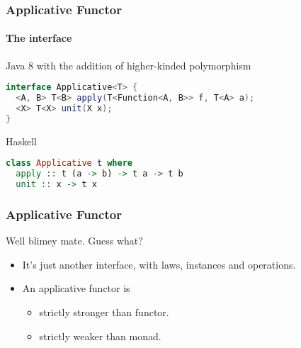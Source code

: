 \begin{frame}[fragile]
\frametitle{Applicative Functor}
\framesubtitle{The interface}
\begin{block}{Java 8 with the addition of higher-kinded polymorphism}
\begin{lstlisting}[style=language,language=java]
interface Applicative<T> {
  <A, B> T<B> apply(T<Function<A, B>> f, T<A> a);
  <X> T<X> unit(X x);
}
\end{lstlisting}
\end{block}
\begin{block}{Haskell}
\begin{lstlisting}[style=language,language=haskell]
class Applicative t where
  apply :: t (a -> b) -> t a -> t b
  unit :: x -> t x
\end{lstlisting}
\end{block}
\end{frame}

\begin{frame}[fragile]
\frametitle{Applicative Functor}
\begin{block}{Well blimey mate. Guess what?}
\begin{itemize}
\item It's just another interface, with laws, instances and operations.
\item An applicative functor is
  \begin{itemize}
  \item strictly stronger than functor.
  \item strictly weaker than monad.
  \end{itemize}
\end{itemize}
\end{block}
\end{frame}
